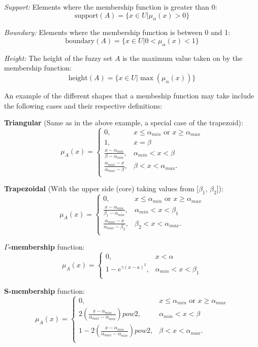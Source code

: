 \textit{Support:} Elements where the membership function is greater than 0:
\[
	\text{support}(A) = \{x \in U \vert \mu_{\alpha}(x) > 0\}
\]

\textit{Boundary:} Elements where the membership function is between 0 and 1:
\[
	\text{boundary}(A) = \{x \in U \vert 0 < \mu_{\alpha}(x) < 1\}
\]

\textit{Height:} The height of the fuzzy set $A$ is the maximum value taken on by the membership function:
\[
	\text{height}(A) = \{x \in U \vert \max(\mu_{\alpha}(x))\}
\]

An example of the different shapes that a membeship function may take include the following cases and their respective definitions:

\textbf{Triangular} (Same as in the above example, a special case of the trapezoid):
\[
	\mu_{A}(x) =
		\begin{cases}
			0, &x \leq \alpha_{min} \text{ or } x \geq \alpha_{max}\\
			1, &x = \beta\\
			\frac{x - \alpha_{min}}{\beta - \alpha_{min}}, &\alpha_{min} < x < \beta\\
			\frac{\alpha_{max} - x}{\alpha_{max} - \beta}, &\beta < x < \alpha_{max}.\\
		\end{cases}
\]

\textbf{Trapezoidal} (With the upper side (core) taking values from [$\beta_1$, $\beta_2$]):
\[
	\mu_{A}(x) =
		\begin{cases}
			0, &x \leq \alpha_{min} \text{ or } x \geq \alpha_{max}\\
			\frac{x - \alpha_{min}}{\beta_1 - \alpha_{min}}, &\alpha_{min} < x < \beta_1\\
			\frac{\alpha_{max} - x}{\alpha_{max} - \beta_2}, &\beta_2 < x < \alpha_{max}.\\
		\end{cases}
\]

\textbf{$\Gamma$-membership} function:
\[
	\mu_{A}(x) =
		\begin{cases}
			0, &x < \alpha\\
			1-e^{\gamma(x-a)^2}, &\alpha_{min} < x < \beta_1\\
		\end{cases}
\]

\textbf{S-membership} function:
\[
	\mu_{A}(x) =
		\begin{cases}
			0, &x \leq \alpha_{min} \text{ or } x \geq \alpha_{max}\\
			2 \left( \frac{x - \alpha_{min}}{\alpha_{max} - \alpha_{min}} \right) pow2, &\alpha_{min} < x < \beta\\
			1 - 2 \left( \frac{x - \alpha_{min}}{\alpha_{max} - \alpha_{min}} \right) pow2, &\beta < x < \alpha_{max}.\\
		\end{cases}
\]

